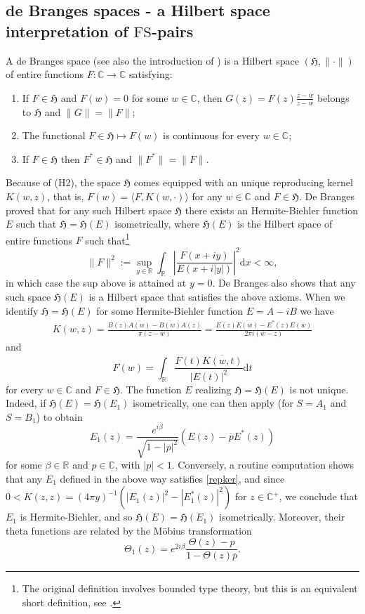 \documentclass[a4paper,reqno,12pt]{amsart}
\renewcommand{\H}{\mathbb{C}^+}
\renewcommand{\r}{\mathbb{R}}
\newcommand{\cp}{\mathbb{C}} %
\newcommand{\be}{\beta}
\renewcommand{\d}{\mathrm{d}}
\newcommand{\w}{\ov{w}}
\newcommand{\1}{{\bf 1}}
\newcommand{\fs}{\mathrm{FS}}
\newcommand{\ov}[1]{\overline{#1}}
\renewcommand{\1}{{\bo 1}}
\newcommand{\h}{\mathfrak{H}}
\begin{document}
\subsection{de Branges spaces  - a Hilbert space interpretation of $\fs$-pairs}
A de Branges space \cite{dB} (see also the introduction of \cite{GL}) is a Hilbert space $(\h,\|\cdot\|)$ of entire functions $F:\cp\to\cp$ satisfying:
\begin{enumerate}
\item[(H1)] If $F\in \h$ and $F(w)=0$ for some $w\in \cp$, then $G(z)=F(z)\frac{z-\w}{z-w}$ belongs to $\h$ and $\|G\|=\|F\|$;
\item[(H2)] The functional $F\in \h\mapsto F(w)$ is continuous for every $w\in \cp$;
\item[(H3)] If $F\in \h$ then $F^*\in \h$ and $\|F^*\|=\|F\|$.
\end{enumerate}
Because of (H2), the space $\h$ comes equipped with an unique reproducing kernel $K(w,z)$, that is, $F(w)=\langle F, K(w,\cdot) \rangle $ for any $w\in \cp$ and $F\in \h$.
De Branges proved \cite[Thm. 23]{dB} that for any such Hilbert space $\h$ there exists an Hermite-Biehler function $E$ such that $\h=\h(E)$ isometrically, where $\h(E)$ is the Hilbert space of entire functions $F$ such that\footnote{The original definition involves bounded type theory, but this is an equivalent short definition, see \cite{GL}.}
$$
\|F\|^2:=\sup_{y\in \r} \int_\r \left|\frac{F(x+iy)}{E(x+i|y|)}\right|^2 \d x < \infty,
$$
in which case the sup above is attained at $y=0$. De Branges also shows \cite[Thm. 19]{dB} that any such space $\h(E)$ is a Hilbert space that satisfies the  above axioms.  When we identify $\h=\h(E)$  for some Hermite-Biehler function $E=A-iB$ we have
\begin{align}\label{repker}
K(w,z)=\frac{B(z)\ov{A(w)}-\ov{B(w)}{A(z)}}{\pi(z-\w)} = \frac{E(z)\ov{E(w)}-E^*(z)E(\w)}{2\pi i(\w-z)}
\end{align}
and
$$
F(w)=\int_\r \frac{F(t)\ov{K(w,t)}}{|E(t)|^2}\d t
$$
for every $w\in \cp$ and $F\in \h$. The function $E$ realizing $\h=\h(E)$ is not unique. Indeed, if $\h(E)=\h(E_1)$ isometrically, one can then apply \cite[Problem 69]{dB} (for $S=A_1$ and $S=B_1$) to obtain
$$
E_1(z) = \frac{e^{i\be}}{\sqrt{1-|p|^2}}(E(z)-\ov{p}E^*(z))
$$
for some $\be\in \r$ and $p\in \cp$, with $|p|<1$. Conversely, a routine computation shows that any $E_1$ defined in the above way satisfies \eqref{repker}, and since $0<K(z,z)=(4\pi y)^{-1}(|E_1(z)|^2-|E_1^*(z)|^2)$ for $z\in \H$, we conclude that $E_1$ is Hermite-Biehler, and so $\h(E)=\h(E_1)$ isometrically. Moreover, their theta functions are related by the M\"obius transformation
$$
\Theta_1(z) = e^{2i\be}\frac{\Theta(z)-p}{1-\Theta(z)\ov{p}} .
$$ 
\end{document}
